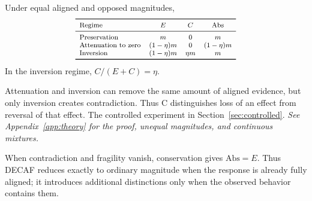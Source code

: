 \begin{proposition}
Under equal aligned and opposed magnitudes,
\[
{\footnotesize
\begin{array}{lccc}
\toprule
\text{Regime} & E & C & \mathrm{Abs} \\
\midrule
\text{Preservation}       & m           & 0      & m \\
\text{Attenuation to zero}& (1-\eta)m  & 0      & (1-\eta)m \\
\text{Inversion}          & (1-\eta)m  & \eta m & m \\
\bottomrule
\end{array}
}
\]
In the inversion regime, $C/(E+C)=\eta$.
\label{prop:calibration}
\end{proposition}
Attenuation and inversion can remove the same amount of aligned evidence, but only inversion creates contradiction. Thus C distinguishes loss of an effect from reversal of that effect. The controlled experiment in Section~\ref{sec:controlled}.
\emph{See Appendix~\ref{app:theory} for the proof, unequal magnitudes, and continuous mixtures.}

When contradiction and fragility vanish, conservation gives $\text{Abs}=E$. Thus DECAF reduces exactly to ordinary magnitude when the response is already fully aligned; it introduces additional distinctions only when the observed behavior contains them.
